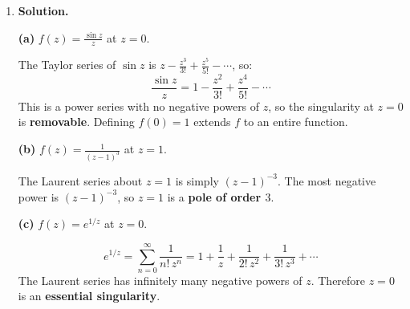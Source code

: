 \begin{enumerate}
\textbf{Residue Theorem:}
\[
\oint_{C_R} f(z)\,dz = 2\pi i \cdot \frac{1}{2i} = \pi.
\]

\textbf{Semicircular contribution:} On $\gamma_R$ ($z = Re^{i\theta}$, $\theta \in [0,\pi]$):
\[
|f(z)| = \frac{1}{|z^2+1|} \leq \frac{1}{R^2 - 1}, \qquad \left|\int_{\gamma_R}f(z)\,dz\right| \leq \frac{\pi R}{R^2 - 1} \xrightarrow{R\to\infty} 0.
\]

\textbf{Conclusion:}
\[
\int_{-\infty}^{\infty}\frac{dx}{x^2+1} = \lim_{R\to\infty}\left[\oint_{C_R}f(z)\,dz - \int_{\gamma_R}f(z)\,dz\right] = \pi - 0 = \pi.
\]

\item \textbf{Solution.}

\textbf{(a)} $f(z) = \frac{\sin z}{z}$ at $z = 0$.

The Taylor series of $\sin z$ is $z - \frac{z^3}{3!} + \frac{z^5}{5!} - \cdots$, so:
\[
\frac{\sin z}{z} = 1 - \frac{z^2}{3!} + \frac{z^4}{5!} - \cdots
\]
This is a power series with no negative powers of $z$, so the singularity at $z = 0$ is \textbf{removable}. Defining $f(0) = 1$ extends $f$ to an entire function.

\textbf{(b)} $f(z) = \frac{1}{(z-1)^3}$ at $z = 1$.

The Laurent series about $z = 1$ is simply $(z-1)^{-3}$. The most negative power is $(z-1)^{-3}$, so $z = 1$ is a \textbf{pole of order $3$}.

\textbf{(c)} $f(z) = e^{1/z}$ at $z = 0$.

\[
e^{1/z} = \sum_{n=0}^{\infty}\frac{1}{n!\,z^n} = 1 + \frac{1}{z} + \frac{1}{2!\,z^2} + \frac{1}{3!\,z^3} + \cdots
\]
The Laurent series has infinitely many negative powers of $z$. Therefore $z = 0$ is an \textbf{essential singularity}.

\end{enumerate}

